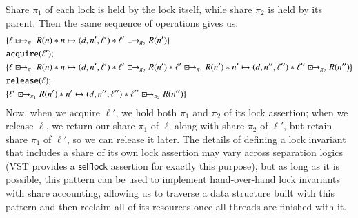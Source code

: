 \documentclass[a4paper,USenglish,cleveref, autoref, thm-restate]{lipics-v2021}
\newcommand{\islock}{\boxdotright}
\begin{document}
Share $\pi_1$ of each lock is held by the lock itself, while share $\pi_2$ is held by its parent. Then the same sequence of operations gives us:
\begin{align*}
&\{ \ell \islock_{\pi_1} R(n) * n \mapsto (d, n', \ell') * \ell' \islock_{\pi_2} R(n') \}\\
&\texttt{acquire}(\ell');\\
&\{ \ell \islock_{\pi_1} R(n) * n \mapsto (d, n', \ell') * \ell' \islock_{\pi_2} R(n') * \ell' \islock_{\pi_1} R(n') * n' \mapsto (d, n'', \ell'') * \ell'' \islock_{\pi_2} R(n'') \}\\
&\texttt{release}(\ell);\\
&\{ \ell' \islock_{\pi_1} R(n') * n' \mapsto (d, n'', \ell'') * \ell'' \islock_{\pi_2} R(n'') \}
\end{align*}
Now, when we acquire $\ell'$, we hold both $\pi_1$ and $\pi_2$ of its lock assertion; when we release $\ell$, we return our share $\pi_1$ of $\ell$ along with share $\pi_2$ of $\ell'$, but retain share $\pi_1$ of $\ell'$, so we can release it later. The details of defining a lock invariant that includes a share of its own lock assertion may vary across separation logics (VST provides a $\mathsf{selflock}$ assertion for exactly this purpose), but as long as it is possible, this pattern can be used to implement hand-over-hand lock invariants with share accounting, allowing us to traverse a data structure built with this pattern and then reclaim all of its resources once all threads are finished with it.
\end{document}
